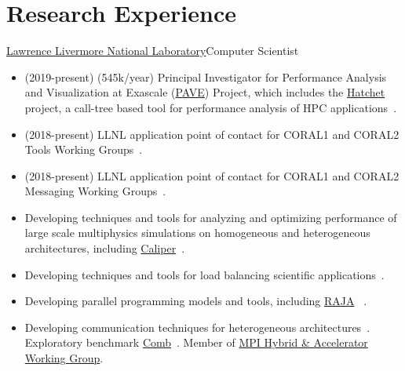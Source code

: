 \section{Research Experience}
		{\href{http://www.llnl.gov}{Lawrence Livermore National Laboratory}}{Computer Scientist}{}{}
		{\begin{itemize}
		  \item (2019-present) (545k/year) Principal Investigator for Performance Analysis and Visualization at Exascale
            (\href{https://computing.llnl.gov/projects/pave-performance-analysis-visualization-exascale}{PAVE}) Project,
            which includes the \href{https://hatchet.readthedocs.io/en/latest/}{Hatchet} project, a call-tree based tool
            for performance analysis of HPC applications~\cite{pearce:ProToolsSC20,pearce:vpa18,pearce:jowog20}.
		\item (2018-present) LLNL application point of contact for CORAL1 and CORAL2 Tools Working Groups~\cite{pearce:Coral2Mar20}.
		\item (2018-present) LLNL application point of contact for CORAL1 and CORAL2 Messaging Working Groups~\cite{pearce:sc19,pearce:ibm19,pearce:summitApr20,pearce:summitDec19,pearce:summitAug19}.
		\item Developing techniques and tools for analyzing and optimizing performance of large scale multiphysics simulations on homogeneous and heterogeneous architectures,
          including \href{https://software.llnl.gov/Caliper/index.html}{Caliper}~\cite{boehme:sc16,pearce:salishan19,pearce:cascWIP19,pearce:necdc18,pearce:gtc18,pearce:jowog18}.
		\item Developing techniques and tools for load balancing scientific applications~\cite{pearce:fgcs18,pearce:sc16pmbs}.
		\item Developing parallel programming models and tools, including \href{https://raja.readthedocs.io/en/main/}{RAJA}
          ~\cite{beckingsale:ipdps17,pearce:p3hpc19,pearce:pc19,pearce:p2s218,pearce:gtc19,pearce:jowog19,pearce:coepp17,trilabL2:15}.
		\item Developing communication techniques for heterogeneous architectures~\cite{pearce:parco20}.
          Exploratory benchmark \href{https://github.com/LLNL/Comb}{Comb}~\cite{pearce:summitApr20,pearce:summitDec19,pearce:summitAug19}.
          Member of \href{https://github.com/mpiwg-hybrid/hybrid-issues}{MPI Hybrid \& Accelerator Working Group}.
		\end{itemize}}

